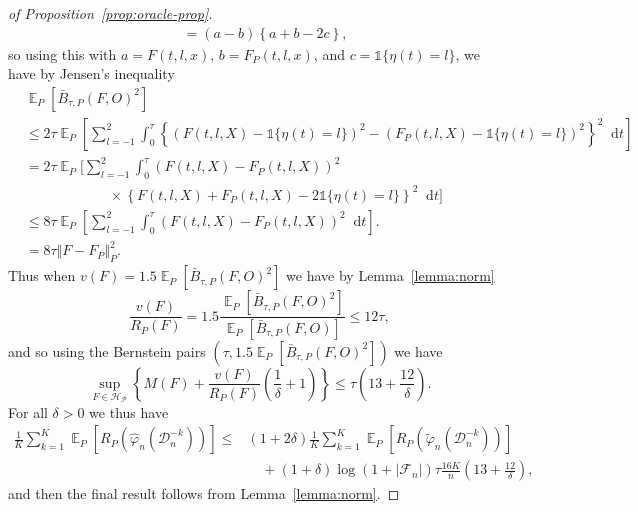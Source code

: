 \documentclass[lineno]{biometrika}
\DeclareMathOperator{\E}{\mathbb{E}} %
\renewcommand{\phi}{\varphi}
\newcommand*\diff{\mathop{}\!\mathrm{d}}
\newcommand{\1}{\mathds{1}}
\newcommand{\data}{\ensuremath{\mathcal{D}}}
\begin{document}
\begin{proof}[of Proposition~\ref{prop:oracle-prop}]
\begin{align*}
  & = (a-b)
    \left\{
     a + b -2c
    \right\},
\end{align*}
so using this with \( a=F(t, l, x) \), \( b=F_P(t, l, x) \), and
\( c = \1{\{\eta(t) = l\}} \), we have by Jensen's inequality
\begin{align*}
  & \E_P{[\bar{B}_{\tau,P}(F, O)^2]}
  \\
  & \leq
    2\tau\E_{P}{\left[
    \sum_{l=-1}^{2} \int_0^{\tau}
    \left\{
    \left(
    F(t, l, X) - \1{\{\eta(t) = l\}}
    \right)^2
    -
    \left(
    F_P(t, l, X) - \1{\{\eta(t) = l\}}
    \right)^2
    \right\}^2
    \diff t 
    \right]}
  \\
  & =2\tau
    \E_{P}\Bigg[
    \sum_{l=-1}^{2} \int_0^{\tau}
    \left(
    F(t, l, X) - F_P(t, l, X)
    \right)^2
  \\
  & \quad \quad \quad\quad \quad \quad \times
    \left\{
    F(t, l, X) +  F_P(t, l, X)-2 \1{\{\eta(t) = l\}}
    \right\}^2
    \diff t 
    \Bigg]
  \\
  & \leq
    8\tau \E_{P}{\left[
    \sum_{l=-1}^{2} \int_0^{\tau}
    \left(
    F(t, l, X) - F_P(t, l, X)
    \right)^2
    \diff t 
    \right]}.
  \\
  & =
    8\tau \Vert F - F_P \Vert_{P}^2.
\end{align*}
Thus when \( v(F) = 1.5 \E_P{[\bar{B}_{\tau,P}(F, O)^2]} \) we have by
Lemma~\ref{lemma:norm}
\begin{equation*}
  \frac{v(F)}{R_P(F)}
  = 1.5 \frac{\E_P{[\bar{B}_{\tau,P}(F, O)^2]}}{\E_P{[\bar{B}_{\tau,P}(F, O)]}}
  \leq 12 \tau,
\end{equation*}
and so using the Bernstein pairs \( (\tau, 1.5 \E_P{[\bar{B}_{\tau,P}(F, O)^2]}) \) we have
\begin{equation*}
  \sup_{F \in \mathcal{H}_{\mathcal{P}}}
  \left\{
    M(F) + \frac{v(F)}{R_P(F)}
    \left(
      \frac{1}{\delta} + 1
    \right)
  \right\}
  \leq \tau
  \left(
    13 + \frac{12}{\delta}
  \right).
\end{equation*}
For all $\delta>0$ we thus have
\begin{align*}
  \frac{1}{K} \sum_{k=1}^{K} \E_{P}{\left[ R_P(\hat{\phi}_n(\data_n^{-k})) \right]}
  \leq
  &(1+2\delta)\frac{1}{K} \sum_{k=1}^{K}\E_{P}{\left[ R_P(\tilde{\phi}_n(\data_n^{-k})) \right]}
  \\
  & \quad
    + (1+\delta)\log(1 + |\mathcal{F}_n|) \tau \frac{16 K}{n}
    \left(
    13 + \frac{12}{\delta}
    \right),
\end{align*}
and then the final result follows from Lemma~\ref{lemma:norm}.
\end{proof}
\end{document}
